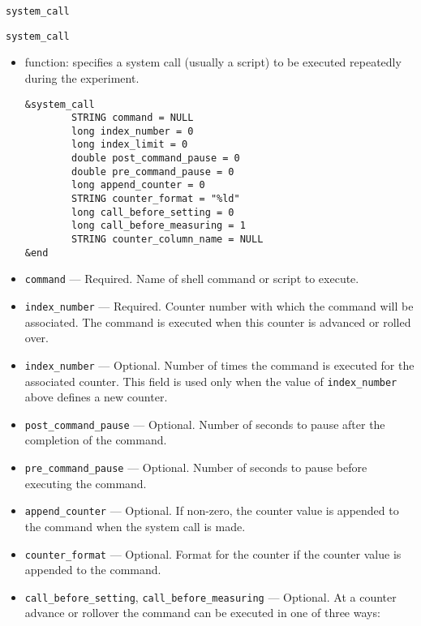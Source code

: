 \begin{itemize}
\begin{itemize}
\begin{latexonly}
\newpage\begin{center}{\Large \verb+system_call+}\end{center}
\end{latexonly}
\begin{htmlonly}
\item {\Large \verb+system_call+}
\end{htmlonly}
\begin{itemize}
        \item function: specifies a system call (usually a script) to be executed repeatedly during the experiment.
\begin{verbatim}
&system_call
        STRING command = NULL
        long index_number = 0
        long index_limit = 0
        double post_command_pause = 0
        double pre_command_pause = 0
        long append_counter = 0
        STRING counter_format = "%ld"
        long call_before_setting = 0
        long call_before_measuring = 1
        STRING counter_column_name = NULL 
&end       
\end{verbatim}
        \item {\verb+command+} --- Required. Name of shell command or script to execute.
        \item {\verb+index_number+} --- Required. Counter number with which the command will be associated. The command is executed
                when this counter is advanced or rolled over.
        \item {\verb+index_number+} --- Optional. Number of times the command is executed for 
                the associated counter. This field is used only when the value of {\verb+index_number+} above defines a new counter.
        \item {\verb+post_command_pause+} --- Optional. Number of seconds to pause after the completion of the command.
        \item {\verb+pre_command_pause+} --- Optional. Number of seconds to pause before executing the command.
        \item {\verb+append_counter+} --- Optional. If non-zero, the counter value is appended to the command when the
                system call is made.
        \item {\verb+counter_format+} --- Optional. Format for the counter if the counter value is appended to the command.
        \item {\verb+call_before_setting+}, {\verb+call_before_measuring+} --- Optional. 
                At a counter advance or rollover the command can be executed in one of three ways:

\end{itemize}
\end{itemize}
\end{itemize}
